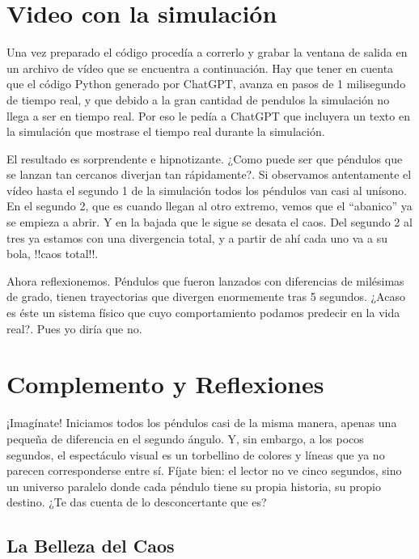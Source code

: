 \documentclass[
  10pt,
  a4paper,
  DIV=11,
  numbers=noendperiod,
  open=any]{scrreprt}
\numberwithin{equation}{chapter}
\numberwithin{equation}{chapter}
\renewcommand{\[}{\begin{equation}}
\renewcommand{\]}{\end{equation}}
\begin{document}
\section{Video con la simulación}\label{sec-abanico}

Una vez preparado el código procedía a correrlo y grabar la ventana de
salida en un archivo de vídeo que se encuentra a continuación. Hay que
tener en cuenta que el código Python generado por ChatGPT, avanza en
pasos de 1 milisegundo de tiempo real, y que debido a la gran cantidad
de pendulos la simulación no llega a ser en tiempo real. Por eso le
pedía a ChatGPT que incluyera un texto en la simulación que mostrase el
tiempo real durante la simulación.

El resultado es sorprendente e hipnotizante. ¿Como puede ser que
péndulos que se lanzan tan cercanos diverjan tan rápidamente?. Si
observamos antentamente el vídeo hasta el segundo 1 de la simulación
todos los péndulos van casi al unísono. En el segundo 2, que es cuando
llegan al otro extremo, vemos que el ``abanico'' ya se empieza a abrir.
Y en la bajada que le sigue se desata el caos. Del segundo 2 al tres ya
estamos con una divergencia total, y a partir de ahí cada uno va a su
bola, !!caos total!!.

Ahora reflexionemos. Péndulos que fueron lanzados con diferencias de
milésimas de grado, tienen trayectorias que divergen enormemente tras 5
segundos. ¿Acaso es éste un sistema físico que cuyo comportamiento
podamos predecir en la vida real?. Pues yo diría que no.

\section{Complemento y Reflexiones}\label{complemento-y-reflexiones}

¡Imagínate! Iniciamos todos los péndulos casi de la misma manera, apenas
una pequeña de diferencia en el segundo ángulo. Y, sin embargo, a los
pocos segundos, el espectáculo visual es un torbellino de colores y
líneas que ya no parecen corresponderse entre sí. Fíjate bien: el lector
no ve cinco segundos, sino un universo paralelo donde cada péndulo tiene
su propia historia, su propio destino. ¿Te das cuenta de lo
desconcertante que es?

\subsection{La Belleza del Caos}\label{la-belleza-del-caos}
\end{document}
